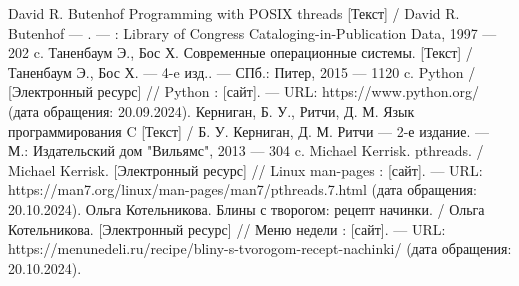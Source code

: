 
\begin{thebibliography}{}
	 David R. Butenhof Programming with POSIX threads [Текст] / David R. Butenhof — . — : Library of Congress Cataloging-in-Publication Data, 1997 — 202 c.
	 Таненбаум Э., Бос Х. Современные операционные системы. [Текст] / Таненбаум Э., Бос Х. — 4-e изд.. — СПб.: Питер, 2015 — 1120 c.
	  Python /  [Электронный ресурс] // Python : [сайт]. — URL: https://www.python.org/ (дата обращения: 20.09.2024).
	 Керниган, Б. У., Ритчи, Д. М. Язык программирования C [Текст] / Б. У. Керниган, Д. М. Ритчи — 2-е издание. — М.: Издательский дом "Вильямс", 2013 — 304 c.
	 Michael Kerrisk. pthreads. / Michael Kerrisk. [Электронный ресурс] // Linux man-pages : [сайт]. — URL: https://man7.org/linux/man-pages/man7/pthreads.7.html (дата обращения: 20.10.2024).
	 Ольга Котельникова. Блины с творогом: рецепт начинки. / Ольга Котельникова. [Электронный ресурс] // Меню недели : [сайт]. — URL: https://menunedeli.ru/recipe/bliny-s-tvorogom-recept-nachinki/ (дата обращения: 20.10.2024).
\end{thebibliography}
